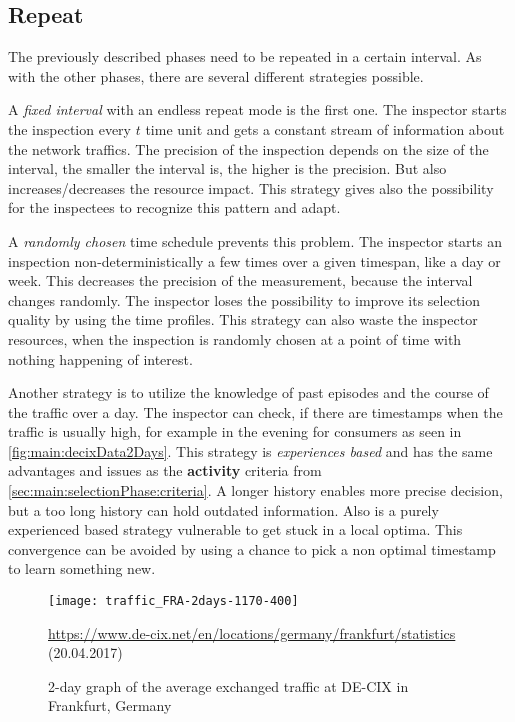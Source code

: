 \documentclass[thesis.tex]{subfiles}
\begin{document}
\subsection{Repeat} \label{sec:main:repeatphase}
The previously described phases need to be repeated in a certain interval. As with the other phases, there are several different strategies possible.

A \textit{fixed interval} with an endless repeat mode is the first one. The inspector starts the inspection every $t$ time unit and gets a constant stream of information about the network traffics. The precision of the inspection depends on the size of the interval, the smaller the interval is, the higher is the precision. But also increases/decreases the resource impact. This strategy gives also the possibility for the inspectees to recognize this pattern and adapt.

A \textit{randomly chosen} time schedule prevents this problem. The inspector starts an inspection non-deterministically a few times over a given timespan, like a day or week. This decreases the precision of the measurement, because the interval changes randomly. The inspector loses the possibility to improve its selection quality by using the time profiles. This strategy can also waste the inspector resources, when the inspection is randomly chosen at a point of time with nothing happening of interest.

Another strategy is to utilize the knowledge of past episodes and the course of the traffic over a day. The inspector can check, if there are timestamps when the traffic is usually high, for example in the evening for consumers as seen in \autoref{fig:main:decixData2Days}. This strategy is \textit{experiences based} and has the same advantages and issues as the \textbf{activity} criteria from \autoref{sec:main:selectionPhase:criteria}. A longer history enables more precise decision, but a too long history can hold outdated information. Also is a purely experienced based strategy vulnerable to get stuck in a local optima. This convergence can be avoided by using a chance to pick a non optimal timestamp to learn something new.


\begin{figure}
	\centering
	\texttt{[image: traffic\_FRA-2days-1170-400]}
	\caption*{\tiny{ \url{https://www.de-cix.net/en/locations/germany/frankfurt/statistics} (20.04.2017)}}
	\caption{2-day graph of the average exchanged traffic at DE-CIX in Frankfurt, Germany}
	\label{fig:main:decixData2Days}
\end{figure}
\end{document}
